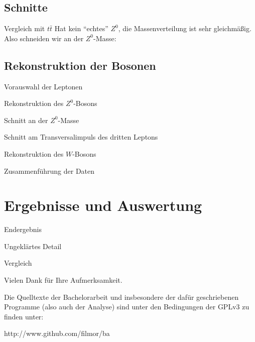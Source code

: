 \documentclass{beamer}
\begin{document}
\subsection{Schnitte}
\begin{frame}{Vergleich mit $t\bar t$}
  Hat kein "`echtes"' $Z^0$, die Massenverteilung ist sehr gleichmäßig.
   \\
  Also schneiden wir an der $Z^0$-Masse:
\end{frame}


\subsection{Rekonstruktion der Bosonen}
\begin{frame}{Vorauswahl der Leptonen}
\end{frame}

\begin{frame}{Rekonstruktion des $Z^0$-Bosons}
\end{frame}
\begin{frame}{Schnitt an der $Z^0$-Masse}
\end{frame}
\begin{frame}{Schnitt am Transversalimpuls des dritten Leptons}
\end{frame}
\begin{frame}{Rekonstruktion des $W$-Bosons}
\end{frame}

\begin{frame}{Zusammenführung der Daten}
\end{frame}

\section{Ergebnisse und Auswertung}
\begin{frame}{Endergebnis}
\end{frame}

\begin{frame}{Ungeklärtes Detail}
\end{frame}

\begin{frame}{Vergleich}
\end{frame}

\begin{frame}{}
  \begin{center}\Large Vielen Dank für Ihre Aufmerksamkeit.\end{center}
  \vskip10pt

  Die Quelltexte der Bachelorarbeit und insbesondere der dafür geschriebenen
  Programme (also auch der Analyse) sind unter den Bedingungen der GPLv3 zu finden
  unter:
  \vskip10pt

  \begin{center}http://www.github.com/filmor/ba\end{center}
\end{frame}
\end{document}
